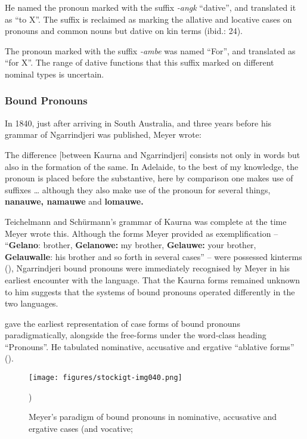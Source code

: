 He named the pronoun marked with the suffix \textit{-angk} ``dative'', and translated it as ``to X''. The suffix is reclaimed as marking the allative and locative cases on pronouns and common nouns \citep[22; 53]{gale_dorothy_2010} but dative on kin terms (ibid.: 24).

The pronoun marked with the suffix \textit{-ambe} was named ``For'', and translated as ``for X''. The range of dative functions that this suffix marked on different nominal types is uncertain.

\subsubsection{Bound Pronouns}
\label{sec:key:6.1.2.4}\label{bkm:Ref73463170}

In 1840, just after arriving in South Australia, and three years before his grammar of Ngarrindjeri was published, Meyer wrote:

\begin{modquote}
	The difference [between Kaurna and Ngarrindjeri] consists not only in words but also in the formation of the same. In Adelaide, to the best of my knowledge, the pronoun is placed before the substantive, here by comparison one makes use of suffixes … although they also make use of the pronoun for several things, \textbf{nanauwe, namauwe} and \textbf{lomauwe.} \citep{meyer_correspondence_1839}
\end{modquote}

Teichelmann and Schürmann’s grammar of Kaurna was complete at the time Meyer wrote this. Although the forms Meyer provided as exemplification – ``\textbf{Gela\-no}: brother, \textbf{Gelanowe:} my brother, \textbf{Gelau\-we:} your brother, \textbf{Gelau\-walle}: his brother and so forth in several cases''  – were possessed kinterms (), Ngarrindjeri bound pronouns were immediately recognised by Meyer in his earliest encounter with the language. That the Kaurna forms remained unknown to him suggests that the systems of bound pronouns operated differently in the two languages.

\citet{meyer_vocabulary_1843} gave the earliest representation of case forms of bound pronouns paradigmatically, alongside the free-forms under the word-class heading ``Pronouns''. He tabulated nominative, accusative and ergative “ablative forms'' ().


\begin{figure}
\texttt{[image: figures/stockigt-img040.png]}
\caption{Meyer’s paradigm of bound pronouns in nominative, accusative and ergative cases (and vocative; \citeyear[23]{meyer_vocabulary_1843}})
\label{fig:key:99}
\end{figure}

